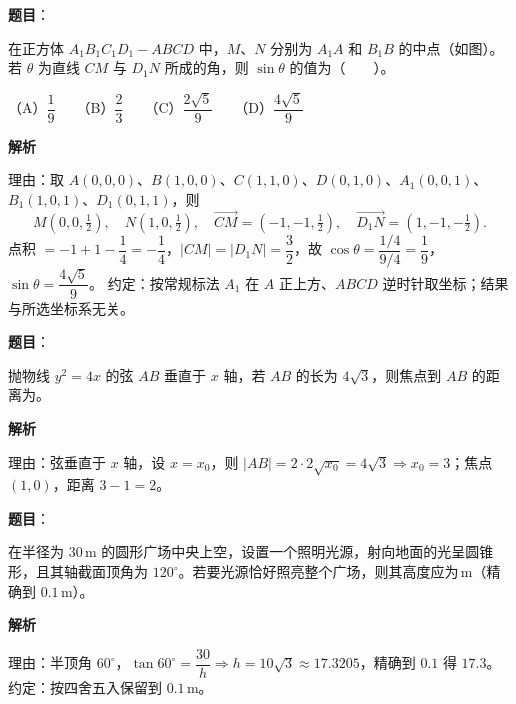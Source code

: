 \begin{answer}

\textbf{题目}：

在正方体 $A_1B_1C_1D_1-ABCD$ 中，$M\text{、}N$ 分别为 $A_1A$ 和 $B_1B$ 的中点（如图）。若 $\theta$ 为直线 $CM$ 与 $D_1N$ 所成的角，则 $\sin\theta$ 的值为\mbox{（　　）}。
\nopagebreak[4]
\begin{center}\end{center}
\nopagebreak[4]
（A）$\dfrac19$　　（B）$\dfrac23$　　（C）$\dfrac{2\sqrt5}{9}$　　（D）$\dfrac{4\sqrt5}{9}$

\textbf{解析}

理由：取 $A(0,0,0)$、$B(1,0,0)$、$C(1,1,0)$、$D(0,1,0)$、$A_1(0,0,1)$、$B_1(1,0,1)$、$D_1(0,1,1)$，则
\nopagebreak[4]
\[
M\left(0,0,\tfrac12\right),\quad N\left(1,0,\tfrac12\right),\quad
\overrightarrow{CM}=\left(-1,-1,\tfrac12\right),\quad
\overrightarrow{D_1N}=\left(1,-1,-\tfrac12\right).
\]
点积 $=-1+1-\dfrac14=-\dfrac14$，$|CM|=|D_1N|=\dfrac32$，故 $\cos\theta=\dfrac{1/4}{9/4}=\dfrac19$，$\sin\theta=\dfrac{4\sqrt5}{9}$。
约定：按常规标法 $A_1$ 在 $A$ 正上方、$ABCD$ 逆时针取坐标；结果与所选坐标系无关。


\end{answer}
\begin{answer}

\textbf{题目}：

抛物线 $y^2=4x$ 的弦 $AB$ 垂直于 $x$ 轴，若 $AB$ 的长为 $4\sqrt3$，则焦点到 $AB$ 的距离为\underline{\qquad\qquad}。

\textbf{解析}

理由：弦垂直于 $x$ 轴，设 $x=x_0$，则 $|AB|=2\cdot2\sqrt{x_0}=4\sqrt3\Rightarrow x_0=3$；焦点 $(1,0)$，距离 $3-1=2$。


\end{answer}
\begin{answer}

\textbf{题目}：

在半径为 $30\,\mathrm m$ 的圆形广场中央上空，设置一个照明光源，射向地面的光呈圆锥形，且其轴截面顶角为 $120^\circ$。若要光源恰好照亮整个广场，则其高度应为\underline{\qquad\qquad}$\,\mathrm m$（精确到 $0.1\,\mathrm m$）。

\textbf{解析}

理由：半顶角 $60^\circ$，$\tan60^\circ=\dfrac{30}{h}\Rightarrow h=10\sqrt3\approx17.3205$，精确到 $0.1$ 得 $17.3$。
约定：按四舍五入保留到 $0.1\,\mathrm m$。


\end{answer}
